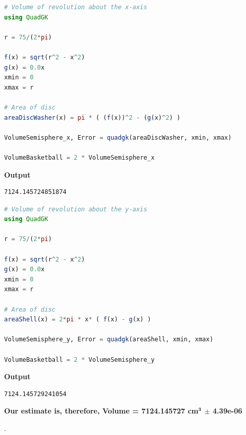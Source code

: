 \begin{lstlisting}[language=Julia,style=mystyle]
# Volume of revolution about the x-axis
using QuadGK

r = 75/(2*pi)

f(x) = sqrt(r^2 - x^2)
g(x) = 0.0x
xmin = 0
xmax = r

# Area of disc
areaDiscWasher(x) = pi * ( (f(x))^2 - (g(x)^2) )

VolumeSemisphere_x, Error = quadgk(areaDiscWasher, xmin, xmax)

VolumeBasketball = 2 * VolumeSemisphere_x
\end{lstlisting}
\textbf{Output} 
\begin{verbatim}
7124.145724851874
\end{verbatim}

\begin{lstlisting}[language=Julia,style=mystyle]
# Volume of revolution about the y-axis
using QuadGK

r = 75/(2*pi)

f(x) = sqrt(r^2 - x^2)
g(x) = 0.0x
xmin = 0
xmax = r

# Area of disc
areaShell(x) = 2*pi * x* ( f(x) - g(x) )

VolumeSemisphere_y, Error = quadgk(areaShell, xmin, xmax)

VolumeBasketball = 2 * VolumeSemisphere_y
\end{lstlisting}
\textbf{Output} 
\begin{verbatim}
7124.145729241054
\end{verbatim}

\textbf{Our estimate is, therefore, Volume = 7124.145727 cm$\bm{^3}$ $\bm{\pm}$ 4.39e-06}

\Qed.




